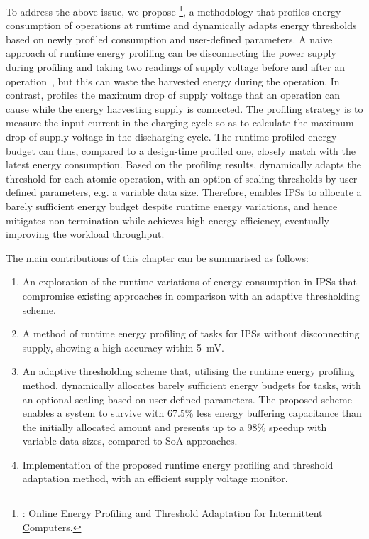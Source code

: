 To address the above issue, we propose \nn{}\footnote{\nn{}: \underline{O}nline Energy \underline{P}rofiling and \underline{T}hreshold Adaptation for \underline{I}ntermittent \underline{C}omputers. }, a methodology that profiles energy consumption of operations at runtime and dynamically adapts energy thresholds based on newly profiled consumption and user-defined parameters. 
A naive approach of runtime energy profiling can be disconnecting the power supply during profiling and taking two readings of supply voltage before and after an operation~\cite{zhan2020adaptive}, but this can waste the harvested energy during the operation. 
In contrast, \nn{} profiles the maximum drop of supply voltage that an operation can cause while the energy harvesting supply is connected. 
The profiling strategy is to measure the input current in the charging cycle so as to calculate the maximum drop of supply voltage in the discharging cycle. 
The runtime profiled energy budget can thus, compared to a design-time profiled one, closely match with the latest energy consumption. 
Based on the profiling results, \nn{} dynamically adapts the threshold for each atomic operation, with an option of scaling thresholds by user-defined parameters, e.g. a variable data size.
Therefore, \nn{} enables IPSs to allocate a barely sufficient energy budget despite runtime energy variations, and hence mitigates non-termination while achieves high energy efficiency, eventually improving the workload throughput.

The main contributions of this chapter can be summarised as follows:

\begin{enumerate}
    \item An exploration of the runtime variations of energy consumption in IPSs that compromise existing approaches in comparison with an adaptive thresholding scheme. 
    \item A method of runtime energy profiling of tasks for IPSs without disconnecting supply, showing a high accuracy within \SI{5}{\milli\volt}.
    \item An adaptive thresholding scheme that, utilising the runtime energy profiling method, dynamically allocates barely sufficient energy budgets for tasks, with an optional scaling based on user-defined parameters. 
    The proposed scheme enables a system to survive with 67.5\% less energy buffering capacitance than the initially allocated amount and presents up to a 98\% speedup with variable data sizes, compared to SoA approaches.
    \item Implementation of the proposed runtime energy profiling and threshold adaptation method, with an efficient supply voltage monitor.
\end{enumerate}

